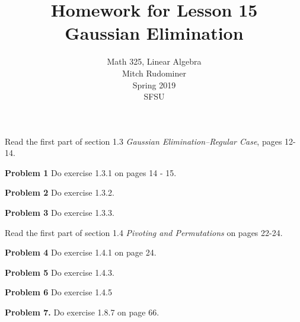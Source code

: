 \documentclass[oneside,12pt]{amsart}
\begin{document}
\title{Homework for Lesson 15 \\ Gaussian Elimination}
\author{Math 325, Linear Algebra \\ Mitch Rudominer \\ Spring 2019 \\ SFSU }
\date{}

\maketitle

\bigskip

Read the first part of section 1.3 \emph{Gaussian Elimination--Regular Case}, pages 12-14.

\textbf{Problem 1} Do exercise 1.3.1 on pages 14 - 15.

\bigskip
\bigskip
\bigskip
\bigskip

\textbf{Problem 2} Do exercise 1.3.2.

\bigskip
\bigskip
\bigskip
\bigskip


\textbf{Problem 3} Do exercise 1.3.3.

\bigskip
\bigskip
\bigskip
\bigskip


Read the first part of section 1.4 \emph{Pivoting and Permutations} on pages 22-24.

\medskip

\textbf{Problem 4} Do exercise 1.4.1 on page 24.

\bigskip
\bigskip
\bigskip
\bigskip

\textbf{Problem 5} Do exercise 1.4.3.

\bigskip
\bigskip
\bigskip
\bigskip

\textbf{Problem 6} Do exercise 1.4.5

\bigskip
\bigskip
\bigskip
\bigskip


\textbf{Problem 7.} Do exercise 1.8.7 on page 66.
\end{document}

